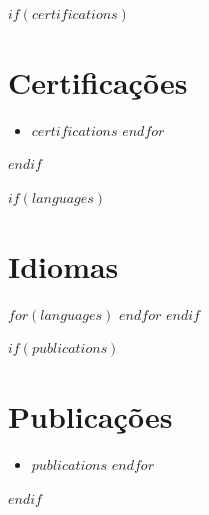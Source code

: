 \documentclass[11pt,a4paper,sans]{moderncv}
\begin{document}
$if(certifications)$
\section{Certificações}
\begin{itemize}%
$for(certifications)$
\item $certifications$
$endfor$
\end{itemize}
$endif$

$if(languages)$
\section{Idiomas}
$for(languages)$
$endfor$
$endif$

$if(publications)$
\section{Publicações}
\begin{itemize}%
$for(publications)$
\item $publications$
$endfor$
\end{itemize}
$endif$
\end{document}
